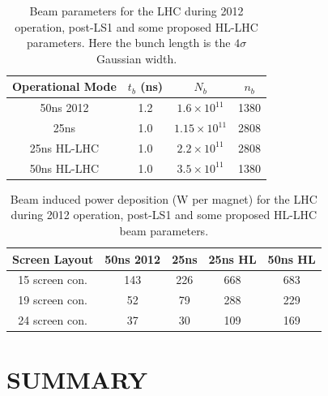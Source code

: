 \documentclass{JAC2003}
\begin{document}
\begin{table}
\caption{Beam parameters for the LHC during 2012 operation, post-LS1 and some proposed HL-LHC parameters. Here the bunch length is the $4\sigma$ Gaussian width.}
\label{tab:BrenHLPara}
\begin{center}
\begin{tabular}{c | c | c | c }
Operational Mode & $t_{b}$ (ns) & $N_{b}$ & $n_{b}$ \\ \hline
50ns 2012 & 1.2 & $1.6 \times 10^{11}$ & 1380 \\ \hline
25ns & 1.0 & $1.15 \times 10^{11}$ & 2808 \\ \hline
25ns HL-LHC & 1.0 &  $2.2 \times 10^{11}$ & 2808 \\ \hline
50ns HL-LHC & 1.0 &  $3.5 \times 10^{11}$ & 1380 \\ 
\end{tabular}
\end{center}
\end{table}

\begin{table}
\caption{Beam induced power deposition (W per magnet) for the LHC during 2012 operation, post-LS1 and some proposed HL-LHC beam parameters.}
\label{tab:PowLoss}
\begin{center}
\begin{tabular}{c | c | c | c | c}
Screen Layout &50ns 2012&25ns&25ns HL&50ns HL\\ \hline
15 screen con. & 143 & 226 & 668 & 683 \\ \hline
19 screen con. & 52 & 79 & 288 & 229 \\ \hline
24 screen con. & 37 & 30 & 109 & 169 \\
\end{tabular}
\end{center}
\end{table}

\section{SUMMARY}
\end{document}
